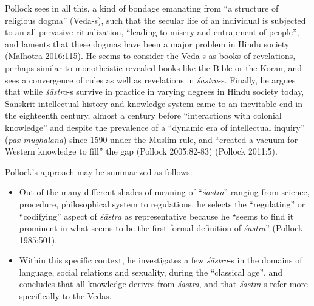 Pollock sees in all this, a kind of bondage emanating from ``a structure of religious dogma'' (Veda-s), such that the secular life of an individual is subjected to an all-pervasive ritualization, ``leading to misery and entrapment of people'', and laments that these dogmas have been a major problem in Hindu society (Malhotra 2016:115). He seems to consider the Veda-s as books of revelations, perhaps similar to monotheistic revealed books like the Bible or the Koran, and sees a convergence of rules as well as revelations in {\sl śāstra}-s. Finally, he argues that while {\sl śāstra}-s survive in practice in varying degrees in Hindu society today, Sanskrit intellectual history and knowledge system came to an inevitable end in the eighteenth century, almost a century before ``interactions with colonial knowledge'' and despite the prevalence of a ``dynamic era of intellectual inquiry'' ({\sl pax mughalana}) since 1590 under the Muslim rule, and ``created a vacuum for Western knowledge to fill'' the gap (Pollock 2005:82-83) (Pollock 2011:5).

Pollock's approach may be summarized as follows:
\begin{itemize}
\item Out of the many different shades of meaning of ``{\sl śāstra}'' ranging from science, procedure, philosophical system to regulations, he selects the ``regulating'' or ``codifying'' aspect of {\sl śāstra} as representative because he ``seems to find it prominent in what seems to be the first formal definition of {\sl śāstra}'' (Pollock 1985:501).

\item Within this specific context, he investigates a few {\sl śāstra}-s in the domains of language, social relations and sexuality, during the ``classical age'', and concludes that all knowledge derives from {\sl śāstra}, and that {\sl śāstra}-s refer more specifically to the Vedas. 
\end{itemize}

